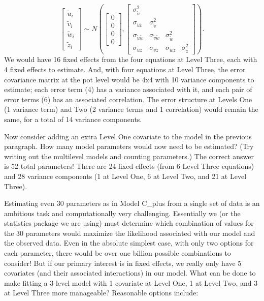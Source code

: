 \documentclass[
]{krantz}
\begin{document}
\[ \left[ \begin{array}{c}
            \tilde{u}_{i} \\ \tilde{v}_{i} \\ \tilde{w}_{i} \\ \tilde{z}_{i}
          \end{array}  \right] \sim N \left( \left[
          \begin{array}{c}
            0 \\ 0 \\ 0 \\ 0
          \end{array} \right], \left[
          \begin{array}{cccc}
            \sigma_{\tilde{u}}^{2} & & & \\
            \sigma_{\tilde{u}\tilde{v}} & \sigma_{\tilde{v}}^{2} & & \\
            \sigma_{\tilde{u}\tilde{w}} & \sigma_{\tilde{v}\tilde{w}} & \sigma_{\tilde{w}}^{2} & \\
            \sigma_{\tilde{u}\tilde{z}} & \sigma_{\tilde{v}\tilde{z}} & \sigma_{\tilde{w}\tilde{z}} & \sigma_{\tilde{z}}^{2}
          \end{array} \right] \right). \]
We would have 16 fixed effects from the four equations at Level Three, each with 4 fixed effects to estimate. And, with four equations at Level Three, the error covariance matrix at the pot level would be 4x4 with 10 variance components to estimate; each error term (4) has a variance associated with it, and each pair of error terms (6) has an associated correlation. The error structure at Levels One (1 variance term) and Two (2 variance terms and 1 correlation) would remain the same, for a total of 14 variance components.

Now consider adding an extra Level One covariate to the model in the previous paragraph. How many model parameters would now need to be estimated? (Try writing out the multilevel models and counting parameters.) The correct answer is 52 total parameters! There are 24 fixed effects (from 6 Level Three equations) and 28 variance components (1 at Level One, 6 at Level Two, and 21 at Level Three).

Estimating even 30 parameters as in Model C\_plus from a single set of data is an ambitious task and computationally very challenging. Essentially we (or the statistics package we are using) must determine which combination of values for the 30 parameters would maximize the likelihood associated with our model and the observed data. Even in the absolute simplest case, with only two options for each parameter, there would be over one billion possible combinations to consider! But if our primary interest is in fixed effects, we really only have 5 covariates (and their associated interactions) in our model. What can be done to make fitting a 3-level model with 1 covariate at Level One, 1 at Level Two, and 3 at Level Three more manageable? Reasonable options include:
\end{document}
